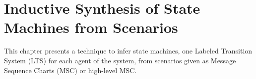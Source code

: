 \chapter{Inductive Synthesis of State Machines from Scenarios\label{chapter:inductive-synthesis}}

This chapter presents a technique to infer state machines, one Labeled Transition System (LTS) for each agent of the system, from scenarios given as Message Sequence Charts (MSC) or high-level MSC.







